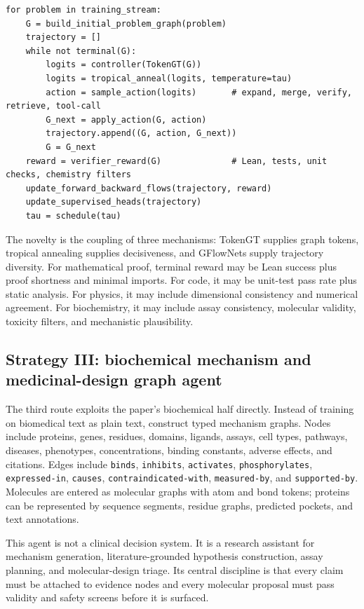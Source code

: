 \documentclass[11pt]{article}
\newcommand{\1}{\mathbf{1}}
\begin{document}
\begin{lstlisting}[caption={GFlowNet-style graph-of-thought training loop.}]
for problem in training_stream:
    G = build_initial_problem_graph(problem)
    trajectory = []
    while not terminal(G):
        logits = controller(TokenGT(G))
        logits = tropical_anneal(logits, temperature=tau)
        action = sample_action(logits)       # expand, merge, verify, retrieve, tool-call
        G_next = apply_action(G, action)
        trajectory.append((G, action, G_next))
        G = G_next
    reward = verifier_reward(G)              # Lean, tests, unit checks, chemistry filters
    update_forward_backward_flows(trajectory, reward)
    update_supervised_heads(trajectory)
    tau = schedule(tau)
\end{lstlisting}

The novelty is the coupling of three mechanisms: TokenGT supplies graph tokens, tropical annealing supplies decisiveness, and GFlowNets supply trajectory diversity. For mathematical proof, terminal reward may be Lean success plus proof shortness and minimal imports. For code, it may be unit-test pass rate plus static analysis. For physics, it may include dimensional consistency and numerical agreement. For biochemistry, it may include assay consistency, molecular validity, toxicity filters, and mechanistic plausibility.

\subsection{Strategy III: biochemical mechanism and medicinal-design graph agent}

The third route exploits the paper's biochemical half directly. Instead of training on biomedical text as plain text, construct typed mechanism graphs. Nodes include proteins, genes, residues, domains, ligands, assays, cell types, pathways, diseases, phenotypes, concentrations, binding constants, adverse effects, and citations. Edges include \texttt{binds}, \texttt{inhibits}, \texttt{activates}, \texttt{phosphorylates}, \texttt{expressed-in}, \texttt{causes}, \texttt{contraindicated-with}, \texttt{measured-by}, and \texttt{supported-by}. Molecules are entered as molecular graphs with atom and bond tokens; proteins can be represented by sequence segments, residue graphs, predicted pockets, and text annotations.

This agent is not a clinical decision system. It is a research assistant for mechanism generation, literature-grounded hypothesis construction, assay planning, and molecular-design triage. Its central discipline is that every claim must be attached to evidence nodes and every molecular proposal must pass validity and safety screens before it is surfaced.
\end{document}
